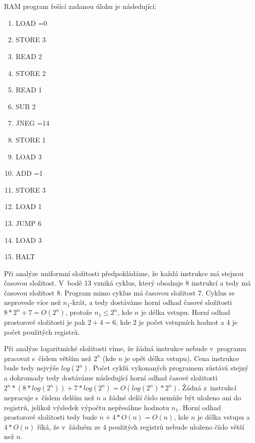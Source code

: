 \documentclass[a4paper]{article}
\begin{document}
\section*{}
RAM program řešící zadanou úlohu je následující:
\begin{enumerate}
    \item LOAD =0
    \item STORE 3
    \item READ 2
    \item STORE 2
    \item READ 1
    \item SUB 2
    \item JNEG =14
    \item STORE 1
    \item LOAD 3
    \item ADD =1
    \item STORE 3
    \item LOAD 1
    \item JUMP 6
    \item LOAD 3
    \item HALT
\end{enumerate}

Při analýze uniformní složitosti předpokládáme, že každá instrukce má stejnou časovou složitost.
V~bodě 13 vzniká cyklus, který obsahuje $8$ instrukcí a tedy má časovou složitost $8$. Program mimo cyklus má časovou složitost $7$.
Cyklus se neprovede více než $n_1$-krát, a tedy dostáváme horní odhad časové složitosti $8*2^n+7=O(2^{n})$,
protože $n_1 \leq 2^n$, kde $n$ je délka vstupu.
Horní odhad prostorové složitosti je pak $2+4=6$, kde $2$ je počet vstupních hodnot a $4$ je počet použitých registrů. 

Při analýze logaritmické složitosti víme, že žádná instrukce nebude v~programu pracovat s~číslem větším než $2^n$
(kde $n$ je opět délka vstupu).
Cena instrukce bude tedy nejvýše $log(2^n)$.
Počet cyklů vykonaných programem zůstává stejný a dohromady tedy dostáváme následující horní odhad časové složitosti
$2^n*(8*log(2^n))+7*log(2^n)=O(log(2^n)*2^n)$.
Žádná z~instrukcí nepracuje s~číslem delším než $n$ a žádné delší číslo nemůže být uloženo ani do registrů, jelikož výsledek výpočtu
nepřesáhne hodnotu $n_1$. Horní odhad prostorové složitosti tedy bude $n+4*O(n)=O(n)$, kde $n$ je délka vstupu a $4*O(n)$ říká, že v~žádném
ze $4$ použitých registrů nebude uloženo číslo větší než $n$.
\end{document}
